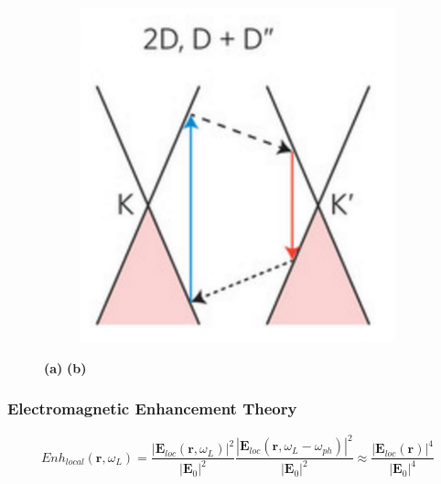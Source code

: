 \begin{figure}[!h]
\begin{subfigure}{0.2\textwidth}
  \end{subfigure}
  ~
  \begin{subfigure}{0.45\textwidth}
    \includegraphics[width=\textwidth]{./images/2d-mode.png}
  \end{subfigure}
  \caption{\textbf{(a)} \textbf{(b)} }
\end{figure}

\subsubsection{Electromagnetic Enhancement Theory}

$$Enh_{local}(\mathbf{r},\omega_L)=\frac{\left|\mathbf{E}_{loc}(\mathbf{r}, \omega_L)\right|^2}{\left|\mathbf{E}_0\right|^2}\frac{\left|\mathbf{E}_{loc}(\mathbf{r}, \omega_L-\omega_{ph})\right|^2}{\left|\mathbf{E}_0\right|^2}\approx\frac{\left|\mathbf{E}_{loc}(\mathbf{r})\right|^4}{\left|\mathbf{E}_0\right|^4}$$

